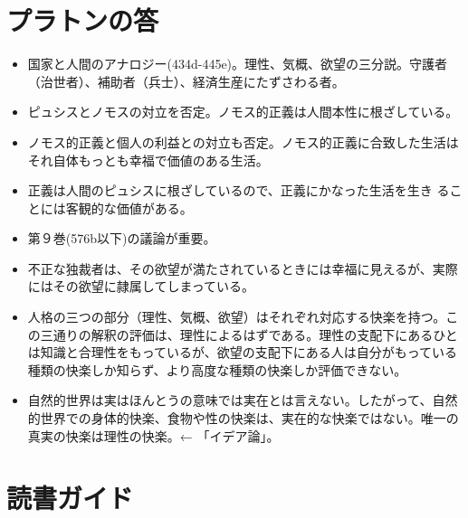 \documentclass{jsarticle}
\begin{document}
\section{プラトンの答}

\begin{itemize}

\item 国家と人間のアナロジー(434d-445e)。理性、気概、欲望の三分説。守護者（治世者）、補助者（兵士）、経済生産にたずさわる者。
\item ピュシスとノモスの対立を否定。ノモス的正義は人間本性に根ざしている。
\item ノモス的正義と個人の利益との対立も否定。ノモス的正義に合致した生活は
それ自体もっとも幸福で価値のある生活。

\item 正義は人間のピュシスに根ざしているので、正義にかなった生活を生き
  ることには客観的な価値がある。


\item 第９巻(576b以下)の議論が重要。

\item 不正な独裁者は、その欲望が満たされているときには幸福に見えるが、実際にはその欲望に隷属してしまっている。

\item 人格の三つの部分（理性、気概、欲望）はそれぞれ対応する快楽を持つ。この三通りの解釈の評価は、理性によるはずである。理性の支配下にあるひとは知識と合理性をもっているが、欲望の支配下にある人は自分がもっている種類の快楽しか知らず、より高度な種類の快楽しか評価できない。

\item 自然的世界は実はほんとうの意味では実在とは言えない。したがって、自然的世界での身体的快楽、食物や性の快楽は、実在的な快楽ではない。唯一の真実の快楽は理性の快楽。← 「イデア論」。





\end{itemize}







\nocite{田中美知太郎57:ソクラテス}
\nocite{中公世界の名著:プラトン1}
\nocite{プラトン57:ゴルギアス}
\nocite{プラトン64:ソクラテスの弁明クリトン}
\nocite{プラトン田中66:国家}
\nocite{プラトン藤沢66:ゴルギアス}
\nocite{納富信留06:ソフィスト}


\section{読書ガイド}
\end{document}

